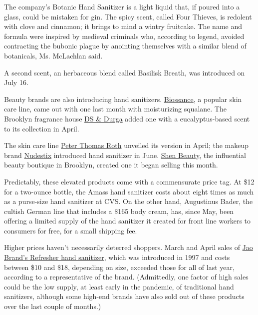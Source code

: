 The company's Botanic Hand Sanitizer is a light liquid that, if poured
into a glass, could be mistaken for gin. The spicy scent, called Four
Thieves, is redolent with clove and cinnamon; it brings to mind a wintry
fruitcake. The name and formula were inspired by medieval criminals who,
according to legend, avoided contracting the bubonic plague by anointing
themselves with a similar blend of botanicals, Ms. McLachlan said.

A second scent, an herbaceous blend called Basilisk Breath, was
introduced on July 16.

Beauty brands are also introducing hand sanitizers.
\href{https://biossance.com/products/squalane-hand-sanitizer}{Biossance},
a popular skin care line, came out with one last month with moisturizing
squalane. The Brooklyn fragrance house
\href{https://dsanddurga.com/search?q=hand+sanitizer\&type=product}{DS
\& Durga} added one with a eucalyptus-based scent to its collection in
April.

The skin care line
\href{https://www.peterthomasroth.com/hand-sanitizer-alcohol-antiseptic-80-topical-solution-3003007.html}{Peter
Thomas Roth} unveiled its version in April; the makeup brand
\href{https://www.nudestix.com/search?type=product\&q=hand+sanitizer}{Nudestix}
introduced hand sanitizer in June.
\href{https://shen-beauty.com/search?q=hand+sanitizer\&type=product}{Shen
Beauty}, the influential beauty boutique in Brooklyn, created one it
began selling this month.

Predictably, these elevated products come with a commensurate price tag.
At \$12 for a two-ounce bottle, the Amass hand sanitizer costs about
eight times as much as a purse-size hand sanitizer at CVS. On the other
hand, Augustinus Bader, the cultish German line that includes a \$165
body cream, has, since May, been offering a limited supply of the hand
sanitizer it created for front line workers to consumers for free, for a
small shipping fee.

Higher prices haven't necessarily deterred shoppers. March and April
sales of \href{https://jaobrand.com/}{Jao Brand's Refresher hand
sanitizer}, which was introduced in 1997 and costs between \$10 and
\$18, depending on size, exceeded those for all of last year, according
to a representative of the brand. (Admittedly, one factor of high sales
could be the low supply, at least early in the pandemic, of traditional
hand sanitizers, although some high-end brands have also sold out of
these products over the last couple of months.)

